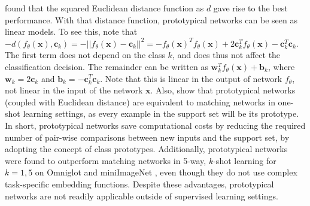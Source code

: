  found that the squared Euclidean distance function as $d$ gave rise to the best performance. With that distance function, prototypical networks can be seen as linear models. To see this, note that $-d(f_{\theta}(\boldsymbol{x}), \boldsymbol{c}_{k}) = -|| f_{\theta}(\boldsymbol{x}) - \boldsymbol{c}_{k}||^{2} = - f_{\theta}(\boldsymbol{x})^{T}f_{\theta}(\boldsymbol{x}) + 2\boldsymbol{c}_{k}^{T}f_{\theta}(\boldsymbol{x}) - \boldsymbol{c}_{k}^{T}\boldsymbol{c}_{k}$. The first term does not depend on the class $k$, and does thus not affect the classification decision. The remainder can
be written as $\boldsymbol{w}_{k}^{T}f_{\theta}(\boldsymbol{x}) + \boldsymbol{b}_{k}$, where $\boldsymbol{w}_{k} = 2\boldsymbol{c}_{k}$ and $\boldsymbol{b}_{k} = -\boldsymbol{c}_{k}^{T}\boldsymbol{c}_{k}$. 
Note that this is linear in the output of network $f_\theta$, not linear in the input of the network $\boldsymbol{x}$. 
Also,  show that prototypical networks (coupled with Euclidean distance) are equivalent to matching networks in one-shot learning settings, as every example in the support set will be its prototype. 
In short, prototypical networks save computational costs by reducing the required number of pair-wise comparisons between new inputs and the support set, by adopting the concept of class prototypes. Additionally, prototypical networks were found to outperform matching networks  in 5-way, $k$-shot learning for $k=1,5$ on Omniglot  and miniImageNet , even though they do not use complex task-specific embedding functions. Despite these advantages, prototypical networks are not readily applicable outside of supervised learning settings.


